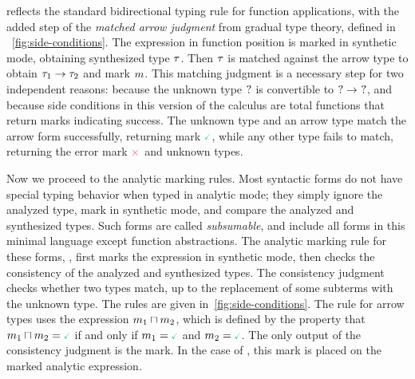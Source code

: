  reflects the standard bidirectional typing rule for function applications, with the added step of the \textit{matched arrow judgment} from gradual type theory, defined in ~\autoref{fig:side-conditions}. The expression in function position is marked in synthetic mode, obtaining synthesized type $\tau$. Then $\tau$ is matched against the arrow type to obtain $\tau_1 \to \tau_2$ and mark $m$. This matching judgment is a necessary step for two independent reasons: because the unknown type $?$ is convertible to  $? \to ~?$, and because side conditions in this version of the calculus are total functions that return marks indicating success. The unknown type and an arrow type match the arrow form successfully, returning mark $\MGood$, while any other type fails to match, returning the error mark $\MBad$ and unknown types. 


Now we proceed to the analytic marking rules. Most syntactic forms do not have special typing behavior when typed in analytic mode; they simply ignore the analyzed type, mark in synthetic mode, and compare the analyzed and synthesized types. Such forms are called \textit{subsumable}, and include all forms in this minimal language except function abstractions. The analytic marking rule for these forms, , first marks the expression in synthetic mode, then checks the consistency of the analyzed and synthesized types. The consistency judgment checks whether two types match, up to the replacement of some subterms with the unknown type. The rules are given in~\autoref{fig:side-conditions}. The rule for arrow types uses the expression $m_1\sqcap m_2$, which is defined by the property that $\markmeet{\MV_1}{\MV_2} = \MGood$ if and only if $\MV_1 = \MGood$ and $\MV_2 = \MGood$. 
The only output of the consistency judgment is the mark. In the case of , this mark is placed on the marked analytic expression. 

